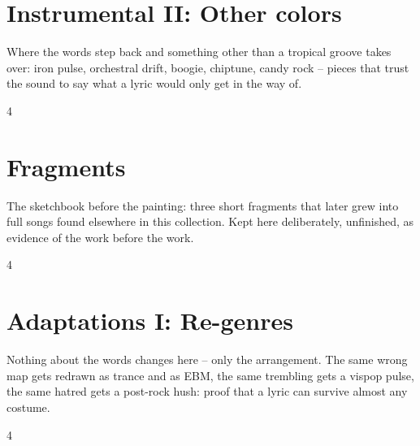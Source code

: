 \documentclass[a4paper,landscape]{memoir}
\begin{document}
\chapter{Instrumental II: Other colors}
Where the words step back and something other than a tropical groove takes over: iron pulse, orchestral drift, boogie, chiptune, candy rock -- pieces that trust the sound to say what a lyric would only get in the way of.
\clearpage\begin{multicols*}{4}
















\end{multicols*}

\chapter{Fragments}
The sketchbook before the painting: three short fragments that later grew into full songs found elsewhere in this collection. Kept here deliberately, unfinished, as evidence of the work before the work.
\clearpage\begin{multicols*}{4}



\end{multicols*}

\chapter{Adaptations I: Re-genres}
Nothing about the words changes here -- only the arrangement. The same wrong map gets redrawn as trance and as EBM, the same trembling gets a vispop pulse, the same hatred gets a post-rock hush: proof that a lyric can survive almost any costume.
\clearpage\begin{multicols*}{4}


























\end{multicols*}
\end{document}
